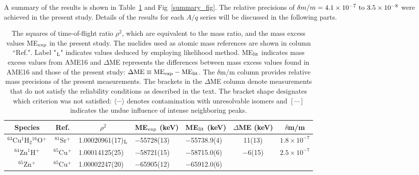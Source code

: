\documentclass[3p]{elsarticle}
\begin{document}
A summary of the results is shown in Table~\ref{summary} and Fig~\ref{summary_fig}. The relative precisions of  $\delta m/m = 4.1\times10^{-7}~{\rm to}~ 3.5\times10^{-8}$ were achieved in the present study. Details of the results for each $A/q$ series will be discussed in the following parts.

\begin{table*}
\begin{center}
\begin{threeparttable}
\caption{\label{tab:table1}The squares of time-of-flight ratio $\rho^2$, which are equivalent to the mass ratio, and the mass excess values ME$_{\rm exp}$ in the present study. The nuclides used as atomic mass references are shown in column ``Ref.". Label "$_{\rm L}$" indicates values deduced by employing likelihood method. ME$_{\rm lit}$ indicates mass excess values from AME16 and $\Delta$ME represents the differences between mass excess values found in AME16 and those of the present study: $\Delta{\rm ME} \equiv {\rm ME}_{\rm exp} - {\rm ME}_{\rm lit}$. The $\delta$m/m column provides relative mass precisions of the present measurements. The brackets in the $\Delta$ME column denote measurements that do not satisfy the reliability conditions as described in the text. The bracket shape designates which criterion was not satisfied: $\langle \cdots \rangle$ denotes contamination with unresolvable isomers and $[ \cdots ]$ indicates the undue influence of intense neighboring peaks. \label{summary}}
\renewcommand{\arraystretch}{1.2}
\renewcommand\thefootnote{\alph{footnote}}
\begin{tabular}{cclllcc} \hline
\textrm{Species}&
\textrm{Ref.}&
\multicolumn{1}{c}{\textrm{$\rho^2$}}&
\multicolumn{1}{c}{\textrm{ME$_{\rm exp}$ (keV)}}&
\multicolumn{1}{c}{\textrm{ME$_{\rm lit}$ (keV)}}&
\multicolumn{1}{c}{\textrm{$\Delta$ME (keV)}}&
\multicolumn{1}{c}{\textrm{$\delta$m/m}}\\ \hline
$^{63}$Cu$^{1}$H$_2$$^{16}$O$^{+}$&$^{81}$Sr$^{+}$&1.00020961(17)$_{\rm L}$&\hspace{0.7em}$-$55728(13)&
$-$55738.9(4)&11(13)&$1.8\times10^{-7}$\\
\hline
$^{64}$Zn$^{1}$H$^{+}$&$^{65}$Cu$^{+}$&1.00014125(25)&\hspace{0.7em}$-$58721(15)&$-$58715.0(6)&$-$6(15)&$2.5\times10^{-7}$\\
$^{65}$Zn$^{+}$&$^{65}$Cu$^{+}$&1.00002247(20)&\hspace{0.7em}$-$65905(12)&$-$65912.0(6)&
$$
\end{tabular}
\end{threeparttable}
\end{center}
\end{table*}
\end{document}
